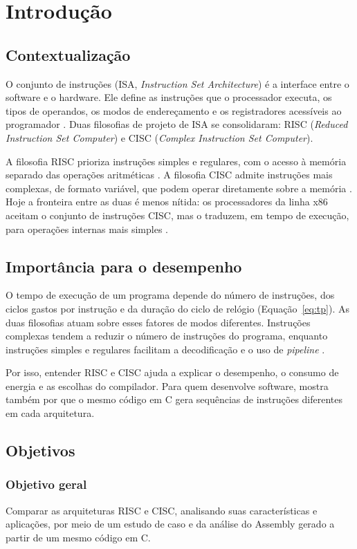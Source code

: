 \chapter{Introdução}
\label{cap:introducao}

\section{Contextualização}
O conjunto de instruções (ISA, \textit{Instruction Set Architecture}) é a interface entre o software e o hardware. Ele define as instruções que o processador executa, os tipos de operandos, os modos de endereçamento e os registradores acessíveis ao programador \cite{stallings2017}. Duas filosofias de projeto de ISA se consolidaram: RISC (\textit{Reduced Instruction Set Computer}) e CISC (\textit{Complex Instruction Set Computer}).

A filosofia RISC prioriza instruções simples e regulares, com o acesso à memória separado das operações aritméticas \cite{stallings2017}. A filosofia CISC admite instruções mais complexas, de formato variável, que podem operar diretamente sobre a memória \cite{silva2024}. Hoje a fronteira entre as duas é menos nítida: os processadores da linha x86 aceitam o conjunto de instruções CISC, mas o traduzem, em tempo de execução, para operações internas mais simples \cite{silva2024}.

\section{Importância para o desempenho}
O tempo de execução de um programa depende do número de instruções, dos ciclos gastos por instrução e da duração do ciclo de relógio (Equação~\ref{eq:tp}). As duas filosofias atuam sobre esses fatores de modos diferentes. Instruções complexas tendem a reduzir o número de instruções do programa, enquanto instruções simples e regulares facilitam a decodificação e o uso de \textit{pipeline} \cite{silva2024}.

Por isso, entender RISC e CISC ajuda a explicar o desempenho, o consumo de energia e as escolhas do compilador. Para quem desenvolve software, mostra também por que o mesmo código em C gera sequências de instruções diferentes em cada arquitetura.

\section{Objetivos}
\subsection{Objetivo geral}
Comparar as arquiteturas RISC e CISC, analisando suas características e aplicações, por meio de um estudo de caso e da análise do Assembly gerado a partir de um mesmo código em C.


